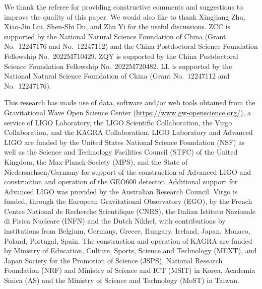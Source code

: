 \documentclass[
reprint,           %
superscriptaddress,%
amsmath,           %
amssymb,           %
aps,               %
prd,               %
notitlepage,       %
longbibliography,  %
floatfix,          %
nofootinbib,
]{revtex4-1}
\begin{document}
\begin{acknowledgments}
We thank the referee for providing constructive comments and suggestions to improve the quality of this paper. 
We would also like to thank Xingjiang Zhu, Xiao-Jin Liu, Shen-Shi Du, and Zhu Yi for the useful discussions.
ZCC is supported by the National Natural Science Foundation of China (Grant No.~12247176 and No.~12247112) and the China Postdoctoral Science Foundation Fellowship No.~2022M710429.
ZQY is supported by the China Postdoctoral Science Foundation Fellowship No.~2022M720482.
LL is supported by the National Natural Science Foundation of China (Grant No.~12247112 and No.~12247176).

This research has made use of data, software and/or web tools obtained from the Gravitational Wave Open Science Center (\url{https://www.gw-openscience.org/}), a service of LIGO Laboratory, the LIGO Scientific Collaboration, the Virgo Collaboration, and the KAGRA Collaboration. 
LIGO Laboratory and Advanced LIGO are funded by the United States National Science Foundation (NSF) as well as the Science and Technology Facilities Council (STFC) of the United Kingdom, the Max-Planck-Society (MPS), and the State of Niedersachsen/Germany for support of the construction of Advanced LIGO and construction and operation of the GEO600 detector. Additional support for Advanced LIGO was provided by the Australian Research Council. Virgo is funded, through the European Gravitational Observatory (EGO), by the French Centre National de Recherche Scientifique (CNRS), the Italian Istituto Nazionale di Fisica Nucleare (INFN) and the Dutch Nikhef, with contributions by institutions from Belgium, Germany, Greece, Hungary, Ireland, Japan, Monaco, Poland, Portugal, Spain. The construction and operation of KAGRA are funded by Ministry of Education, Culture, Sports, Science and Technology (MEXT), and Japan Society for the Promotion of Science (JSPS), National Research Foundation (NRF) and Ministry of Science and ICT (MSIT) in Korea, Academia Sinica (AS) and the Ministry of Science and Technology (MoST) in Taiwan.
\end{acknowledgments}	
	
% 

\end{document}
